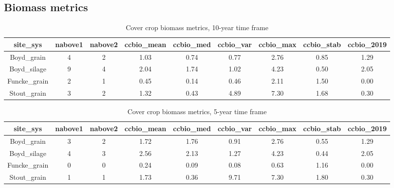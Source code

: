 \documentclass[
]{article}
\begin{document}
\hypertarget{biomass-metrics}{%
\subsection{Biomass metrics}\label{biomass-metrics}}

\begin{table}[H]

\caption{\label{tab:ccbio10yr}Cover crop biomass metrics, 10-year time frame}
\centering
\begin{tabular}[t]{ccccccccc}
\toprule
site\_sys & nabove1 & nabove2 & ccbio\_mean & ccbio\_med & ccbio\_var & ccbio\_max & ccbio\_stab & ccbio\_2019\\
\midrule
\rowcolor{gray!6}  Boyd\_grain & 4 & 2 & 1.03 & 0.74 & 0.77 & 2.76 & 0.85 & 1.29\\
\cmidrule{1-9}
Boyd\_silage & 9 & 4 & 2.04 & 1.74 & 1.02 & 4.23 & 0.50 & 2.05\\
\cmidrule{1-9}
\rowcolor{gray!6}  Funcke\_grain & 2 & 1 & 0.45 & 0.14 & 0.46 & 2.11 & 1.50 & 0.00\\
\cmidrule{1-9}
Stout\_grain & 3 & 2 & 1.32 & 0.43 & 4.89 & 7.30 & 1.68 & 0.30\\
\bottomrule
\end{tabular}
\end{table}

\begin{table}[H]

\caption{\label{tab:ccbio5yr}Cover crop biomass metrics, 5-year time frame}
\centering
\begin{tabular}[t]{ccccccccc}
\toprule
site\_sys & nabove1 & nabove2 & ccbio\_mean & ccbio\_med & ccbio\_var & ccbio\_max & ccbio\_stab & ccbio\_2019\\
\midrule
\rowcolor{gray!6}  Boyd\_grain & 3 & 2 & 1.72 & 1.76 & 0.91 & 2.76 & 0.55 & 1.29\\
\cmidrule{1-9}
Boyd\_silage & 4 & 3 & 2.56 & 2.13 & 1.27 & 4.23 & 0.44 & 2.05\\
\cmidrule{1-9}
\rowcolor{gray!6}  Funcke\_grain & 0 & 0 & 0.24 & 0.09 & 0.08 & 0.63 & 1.16 & 0.00\\
\cmidrule{1-9}
Stout\_grain & 1 & 1 & 1.73 & 0.36 & 9.71 & 7.30 & 1.80 & 0.30\\
\bottomrule
\end{tabular}
\end{table}
\end{document}
